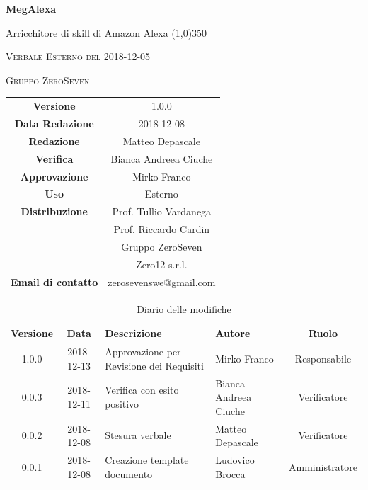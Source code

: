 \documentclass[a4paper,12pt]{article}
\author{Matteo Depascale}
\date{2018-12-08}
\begin{document}
\begin{titlepage}
	\centering
	{\huge\bfseries MegAlexa\par}
	Arricchitore di skill di Amazon Alexa
	\line(1,0){350} \\
	{\scshape\LARGE Verbale Esterno del 2018-12-05 \par}
	\vspace{1cm}
	{\scshape Gruppo ZeroSeven \par}
	\logo
	\begin{tabular}{c|c}
		{\hfill \textbf{Versione}} 			& 1.0.0				\\
		{\hfill\textbf{Data Redazione}} 	& 2018-12-08		\\
		{\hfill\textbf{Redazione}} 			&  		Matteo Depascale			\\
		{\hfill\textbf{Verifica}} 				&  		Bianca Andreea Ciuche		\\
		{\hfill\textbf{Approvazione}} 		&  		Mirko Franco	\\
		{\hfill\textbf{Uso}} 					& 	Esterno	\\
		{\hfill\textbf{Distribuzione}} 			& 			Prof. Tullio Vardanega \\ & Prof. Riccardo Cardin \\ & Gruppo ZeroSeven \\ & Zero12 s.r.l. \\
		{\hfill\textbf{Email di contatto}} & zerosevenswe@gmail.com \\
	\end{tabular}
\end{titlepage}



	\label{LastFrontPage}


	\newpage
	\cleardoublepage
		\begin{table}[tbph]
		\centering
		\begin{tabularx}{\textwidth}{|c|c|X|X|c|}
			\hline
			\textbf{Versione} & \textbf{Data} & \textbf{Descrizione} & \textbf{Autore} & \textbf{Ruolo} \\
			\hline
			1.0.0 & 2018-12-13 & Approvazione per Revisione dei Requisiti & Mirko Franco & Responsabile \\
			\hline
			0.0.3 & 2018-12-11 & Verifica con esito positivo & Bianca Andreea Ciuche & Verificatore \\
			\hline
			0.0.2 & 2018-12-08 & Stesura verbale & Matteo Depascale & Verificatore \\
			\hline
			0.0.1 & 2018-12-08 & Creazione template documento
			& Ludovico Brocca & Amministratore\\
			\hline
		\end{tabularx}
		\caption{Diario delle modifiche}
	\end{table}
\end{document}
